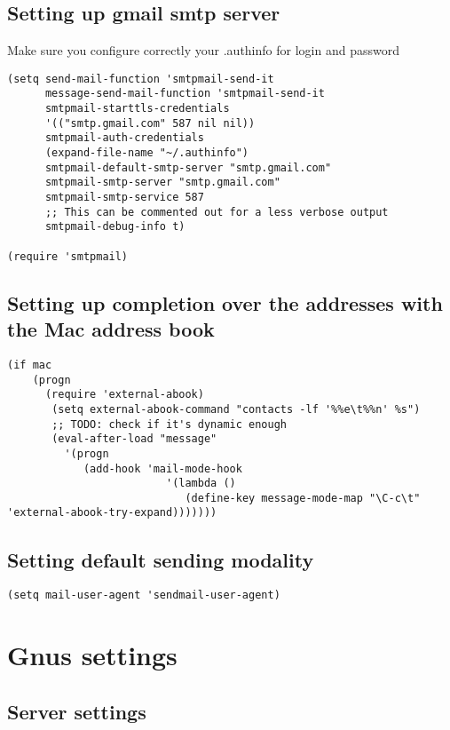 \documentclass[11pt]{article}
\begin{document}
\subsection{Setting up gmail smtp server}
\label{sec-34.2}

   Make sure you configure correctly your .authinfo for login and password

\begin{verbatim}
(setq send-mail-function 'smtpmail-send-it
      message-send-mail-function 'smtpmail-send-it
      smtpmail-starttls-credentials
      '(("smtp.gmail.com" 587 nil nil))
      smtpmail-auth-credentials
      (expand-file-name "~/.authinfo")
      smtpmail-default-smtp-server "smtp.gmail.com"
      smtpmail-smtp-server "smtp.gmail.com"
      smtpmail-smtp-service 587
      ;; This can be commented out for a less verbose output
      smtpmail-debug-info t)

(require 'smtpmail)
\end{verbatim}
\subsection{Setting up completion over the addresses with the Mac address book}
\label{sec-34.3}

\begin{verbatim}
(if mac
    (progn
      (require 'external-abook)
       (setq external-abook-command "contacts -lf '%%e\t%%n' %s")
       ;; TODO: check if it's dynamic enough
       (eval-after-load "message"
         '(progn 
            (add-hook 'mail-mode-hook
                         '(lambda ()
                            (define-key message-mode-map "\C-c\t" 'external-abook-try-expand)))))))
\end{verbatim}
\subsection{Setting default sending modality}
\label{sec-34.4}

\begin{verbatim}
(setq mail-user-agent 'sendmail-user-agent)
\end{verbatim}
\section{Gnus settings}
\label{sec-35}
\subsection{Server settings}
\label{sec-35.1}
\end{document}
